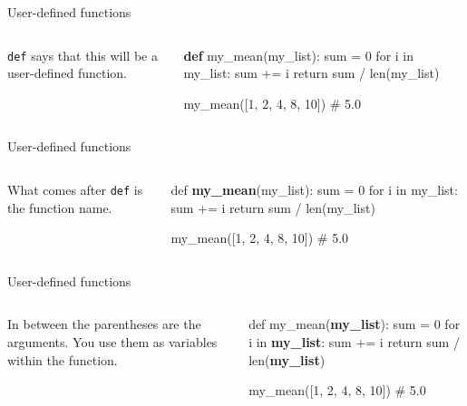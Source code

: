 \documentclass{beamer}
\begin{document}
\begin{frame}[fragile]{User-defined functions}
    \begin{columns}
        \begin{column}{0.3\textwidth}
            \texttt{def} says that this will be a user-defined function.
        \end{column}
        \begin{column}{0.7\textwidth}
        \small
\begin{block}{}
\begin{semiverbatim}
    \textbf{def} my_mean(my_list):
        sum = 0
        for i in my_list:
            sum += i
        return sum / len(my_list)

    my_mean([1, 2, 4, 8, 10])
    # 5.0
\end{semiverbatim}
\end{block}  
        \end{column}
    \end{columns}
\end{frame}

\begin{frame}[fragile]{User-defined functions}
    \begin{columns}
        \begin{column}{0.3\textwidth}
            What comes after \texttt{def} is the function name.
        \end{column}
        \begin{column}{0.7\textwidth}
        \small
\begin{block}{}
\begin{semiverbatim}
    def \textbf{my_mean}(my_list):
        sum = 0
        for i in my_list:
            sum += i
        return sum / len(my_list)

    my_mean([1, 2, 4, 8, 10])
    # 5.0
\end{semiverbatim}
\end{block}  
        \end{column}
    \end{columns}
\end{frame}

\begin{frame}[fragile]{User-defined functions}
    \begin{columns}
        \begin{column}{0.3\textwidth}
            In between the parentheses are the arguments. You use them as variables within the function.
        \end{column}
        \begin{column}{0.7\textwidth}
        \small
\begin{block}{}
\begin{semiverbatim}
    def my_mean(\textbf{my_list}):
        sum = 0
        for i in \textbf{my_list}:
            sum += i
        return sum / len(\textbf{my_list})

    my_mean([1, 2, 4, 8, 10])
    # 5.0
\end{semiverbatim}
\end{block}  
        \end{column}
    \end{columns}
\end{frame}
\end{document}
